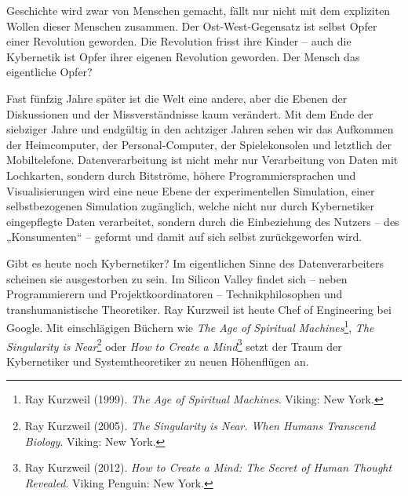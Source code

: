 \documentclass[12pt,a4paper]{article}
\begin{document}
Geschichte wird zwar von Menschen gemacht, fällt nur nicht mit dem expliziten
Wollen dieser Menschen zusammen. Der Ost-West-Gegensatz ist selbst Opfer einer
Revolution geworden. Die Revolution frisst ihre Kinder -- auch die Kybernetik
ist Opfer ihrer eigenen Revolution geworden. Der Mensch das eigentliche Opfer?

Fast fünfzig Jahre später ist die Welt eine andere, aber die Ebenen der
Diskussionen und der Missverständnisse kaum verändert.  Mit dem Ende der
siebziger Jahre und endgültig in den achtziger Jahren sehen wir das Aufkommen
der Heimcomputer, der Personal-Computer, der Spielekonsolen und letztlich der
Mobiltelefone.  Datenverarbeitung ist nicht mehr nur Verarbeitung von Daten
mit Lochkarten, sondern durch Bitströme, höhere Programmiersprachen und
Visualisierungen wird eine neue Ebene der experimentellen Simulation, einer
selbstbezogenen Simulation zugänglich, welche nicht nur durch Kybernetiker
eingepflegte Daten verarbeitet, sondern durch die Einbeziehung des Nutzers --
des „Konsumenten“ -- geformt und damit auf sich selbst zurückgeworfen wird.

Gibt es heute noch Kybernetiker? Im eigentlichen Sinne des Datenverarbeiters
scheinen sie ausgestorben zu sein. Im Silicon Valley findet sich -- neben
Programmierern und Projektkoordinatoren -- Technikphilosophen und
transhumanistische Theoretiker. Ray Kurzweil ist heute Chef of Engineering bei
Google. Mit einschlägigen Büchern wie \emph{The Age of Spiritual
  Machines}\footnote{Ray Kurzweil (1999). \emph{The Age of Spiritual
    Machines}. Viking: New York.}, \emph{The Singularity is Near}\footnote{Ray
  Kurzweil (2005). \emph{The Singularity is Near. When Humans Transcend
    Biology}. Viking: New York. } oder \emph{How to Create a
  Mind}\footnote{Ray Kurzweil (2012). \emph{How to Create a Mind: The Secret
    of Human Thought Revealed}. Viking Penguin: New York. } setzt der Traum
der Kybernetiker und Systemtheoretiker zu neuen Höhenflügen an.
\end{document}
